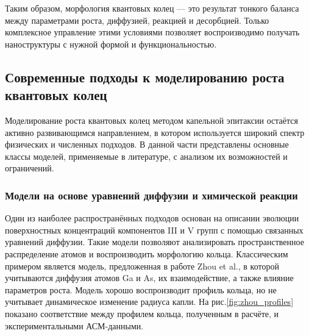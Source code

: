 \documentclass[14pt,oneside]{extarticle}
\begin{document}
Таким образом, морфология квантовых колец — это результат тонкого баланса между параметрами роста, диффузией, реакцией и десорбцией. Только комплексное управление этими условиями позволяет воспроизводимо получать наноструктуры с нужной формой и функциональностью.

\subsection{Современные подходы к моделированию роста квантовых колец}

Моделирование роста квантовых колец методом капельной эпитаксии остаётся активно развивающимся направлением, в котором используется широкий спектр физических и численных подходов. В данной части представлены основные классы моделей, применяемые в литературе, с анализом их возможностей и ограничений.

\subsubsection*{Модели на основе уравнений диффузии и химической реакции}

Один из наиболее распространённых подходов основан на описании эволюции поверхностных концентраций компонентов III и V групп с помощью связанных уравнений диффузии. Такие модели позволяют анализировать пространственное распределение атомов и воспроизводить морфологию кольца. Классическим примером является модель, предложенная в работе Zhou et al.\cite{zhou2013}, в которой учитываются диффузия атомов Ga и As, их взаимодействие, а также влияние параметров роста. Модель хорошо воспроизводит профиль кольца, но не учитывает динамическое изменение радиуса капли. На рис.\ref{fig:zhou_profiles} показано соответствие между профилем кольца, полученным в расчёте, и экспериментальными АСМ-данными.
\end{document}
